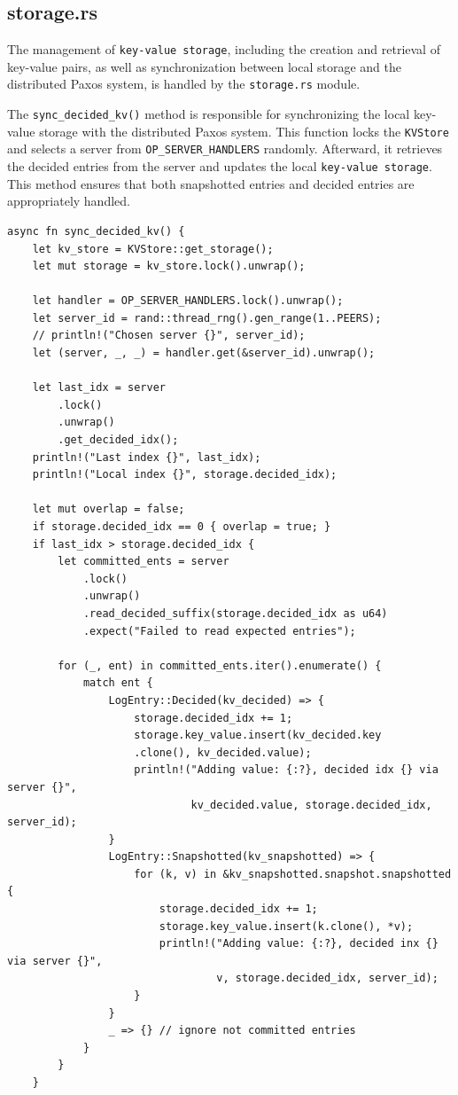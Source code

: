 \documentclass[a4paper, 11pt]{article}
\begin{document}
\subsection{storage.rs}

The management of \verb|key-value storage|, including the creation and retrieval of key-value pairs, as well as synchronization between local storage and the distributed Paxos system, is handled by the \verb|storage.rs| module.
\par
The \verb|sync_decided_kv()| method is responsible for synchronizing the local key-value storage with the distributed Paxos system. This function locks the \verb|KVStore| and selects a server from \verb|OP_SERVER_HANDLERS| randomly. Afterward, it retrieves the decided entries from the server and updates the local \verb|key-value storage|. This method ensures that both snapshotted entries and decided entries are appropriately handled.
\begin{verbatim}
async fn sync_decided_kv() {
    let kv_store = KVStore::get_storage();
    let mut storage = kv_store.lock().unwrap();

    let handler = OP_SERVER_HANDLERS.lock().unwrap();
    let server_id = rand::thread_rng().gen_range(1..PEERS);
    // println!("Chosen server {}", server_id);
    let (server, _, _) = handler.get(&server_id).unwrap();

    let last_idx = server
        .lock()
        .unwrap()
        .get_decided_idx();
    println!("Last index {}", last_idx);
    println!("Local index {}", storage.decided_idx);

    let mut overlap = false;
    if storage.decided_idx == 0 { overlap = true; }
    if last_idx > storage.decided_idx {
        let committed_ents = server
            .lock()
            .unwrap()
            .read_decided_suffix(storage.decided_idx as u64)
            .expect("Failed to read expected entries");

        for (_, ent) in committed_ents.iter().enumerate() {
            match ent {
                LogEntry::Decided(kv_decided) => {
                    storage.decided_idx += 1;
                    storage.key_value.insert(kv_decided.key
                    .clone(), kv_decided.value);
                    println!("Adding value: {:?}, decided idx {} via server {}",
                             kv_decided.value, storage.decided_idx, server_id);
                }
                LogEntry::Snapshotted(kv_snapshotted) => {
                    for (k, v) in &kv_snapshotted.snapshot.snapshotted {
                        storage.decided_idx += 1;
                        storage.key_value.insert(k.clone(), *v);
                        println!("Adding value: {:?}, decided inx {} via server {}",
                                 v, storage.decided_idx, server_id);
                    }
                }
                _ => {} // ignore not committed entries
            }
        }
    }
\end{verbatim}
\end{document}
